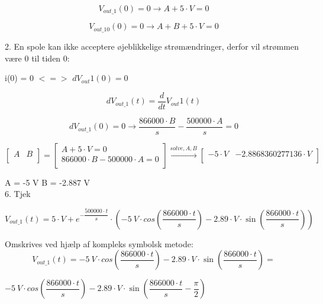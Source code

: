\begin{equation}
	V_{out\_1}  \left(0\right)  = 0 \xrightarrow{} A+5\cdot V = 0
\end{equation}

\begin{equation}
	V_{out\_10}  \left(0\right)  = 0 \xrightarrow{} A+B+5\cdot V = 0
\end{equation}

2. En spole kan ikke acceptere øjeblikkelige strømændringer, derfor vil strømmen være 0 til tiden 0:

i(0) = 0 $<=>$ $dV_{out}{1}(0)=0$

\begin{equation}
 dV_{out\_1} \left(t\right) = \dfrac{d}{dt}V_{out}{1}(t)
\end{equation}
 
\begin{equation}
	dV_{out\_1}  \left(0\right)  = 0 \xrightarrow{} \dfrac{866000\cdot B}{s}-\dfrac{500000\cdot A}{s} = 0
\end{equation}

\begin{equation}
	\begin{bmatrix}
		A &B \\
	\end{bmatrix}
	 = 
	\begin{bmatrix}
		A+5\cdot V = 0 \\
		866000\cdot B-500000\cdot A = 0 \\
	\end{bmatrix}
	 \xrightarrow{solve, A, B} 
	\begin{bmatrix}
		 -5\cdot V & -2.8868360277136\cdot V \\
	\end{bmatrix}
\end{equation}

A = -5 V
B = -2.887 V \\

6. Tjek

\begin{equation}
	V_{out\_1} \left(t\right)  = 5\cdot V+e^{ -\dfrac{500000\cdot t}{s}}\cdot  \left( -5\ V\cdot cos  \left(\dfrac{866000\cdot t}{s}\right) -2.89\cdot V\cdot \sin  \left(\dfrac{866000\cdot t}{s}\right) \right)
	\label{specifik1K} 
\end{equation}

Omskrives ved hjælp af kompleks symbolsk metode: \\

\begin{equation}
	V_{out\_1}  \left(t\right)  =  -5\ V\cdot cos  \left(\dfrac{866000\cdot t}{s}\right) -2.89\cdot V\cdot \sin  \left(\dfrac{866000\cdot t}{s}\right)  = 
	\end{equation}
\begin{center}
$ -5\ V\cdot cos  \left(\dfrac{866000\cdot t}{s}\right) -2.89\cdot V\cdot \sin  \left(\dfrac{866000\cdot t}{s}-\dfrac{\pi}{2}\right) $
\end{center}



